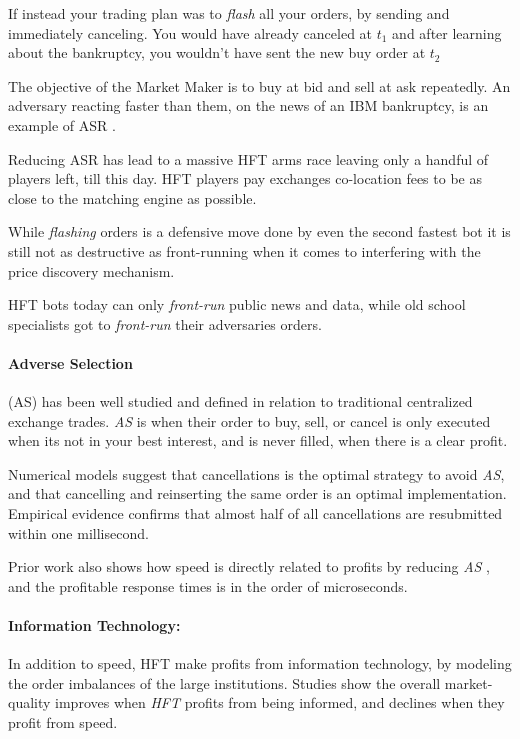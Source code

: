 \documentclass[12pt]{article}
\begin{document}
If instead your trading plan was to \emph{flash} all your orders, by sending and immediately canceling. You would have already canceled at $t_1$ and after learning about the bankruptcy, you wouldn't have sent the new buy order at $t_2$

The objective of the Market Maker is to buy at bid and sell at ask repeatedly. An adversary reacting faster than them, on the news of an IBM bankruptcy, is an example of ASR . 

Reducing ASR has lead to a massive HFT arms race leaving only a handful of players left, till this day. HFT players pay exchanges co-location fees to be as close to the matching engine as possible. 

While \emph{flashing} orders is a defensive move done by even the second fastest bot it is still not as destructive as front-running when it comes to interfering with the price discovery mechanism. 

HFT bots today can only \emph{front-run} public news and data, while old school specialists got to \emph{front-run} their adversaries orders. 

\paragraph{Adverse Selection} (AS) has been well studied and defined in relation to traditional centralized exchange trades. \emph{AS} is when their order to buy, sell, or cancel is only executed when its not in your best interest, and is never filled, when there is a clear profit. 

Numerical models suggest that cancellations is the optimal strategy to avoid \emph{AS}, and that cancelling and reinserting the same order is an optimal implementation. \cite{Lehalle}  Empirical evidence confirms that almost half of all cancellations are resubmitted within one millisecond. \cite{Menkveld2} 

Prior work also shows how speed is directly related to profits by reducing \emph{AS} \cite{Lehalle},  and the profitable response times is in the order of microseconds. \cite{Menkveld2} 

\paragraph{Information Technology:} In addition to speed, HFT make profits from information technology, by modeling the order imbalances of the large institutions. Studies show the overall market-quality improves when \emph{HFT} profits from being informed, and declines when they profit from speed. \cite{Menkveld2}
\end{document}
